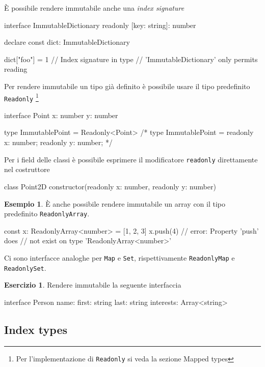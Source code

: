 \documentclass[12pt]{article}
\theoremstyle{definition}
\newtheorem{example}{Esempio}[subsection]
\newtheorem{exercise}{Esercizio}[subsection]
\newenvironment{code}
  {\vspace{0.5cm} \VerbatimEnvironment\begin{typescriptcode}}
  {\end{typescriptcode} \vspace{0.2cm}}
\begin{document}
È possibile rendere immutabile anche una \emph{index signature}

\begin{code}
interface ImmutableDictionary {
  readonly [key: string]: number
}

declare const dict: ImmutableDictionary

dict["foo"] = 1 // Index signature in type
// 'ImmutableDictionary' only permits reading
\end{code}

Per rendere immutabile un tipo già definito è possibile usare il tipo predefinito \texttt{Readonly}
\footnote{Per l'implementazione di \texttt{Readonly} si veda la sezione Mapped types}

\begin{code}
interface Point {
  x: number
  y: number
}

type ImmutablePoint = Readonly<Point>
/*
type ImmutablePoint = {
    readonly x: number;
    readonly y: number;
}
*/
\end{code}

Per i field delle classi è possibile esprimere il modificatore \texttt{readonly} direttamente nel costruttore

\begin{code}
class Point2D {
  constructor(readonly x: number, readonly y: number) {}
}
\end{code}

\begin{example}
È anche possibile rendere immutabile un array con il tipo predefinito
\texttt{ReadonlyArray}.

\begin{code}
const x: ReadonlyArray<number> = [1, 2, 3]
x.push(4) // error: Property 'push' does
// not exist on type 'ReadonlyArray<number>'
\end{code}
\end{example}

Ci sono interfacce analoghe per \texttt{Map} e \texttt{Set}, rispettivamente \texttt{ReadonlyMap} e \texttt{ReadonlySet}.

\begin{exercise}
Rendere immutabile la seguente interfaccia

\begin{code}
interface Person {
  name: {
    first: string
    last: string
  }
  interests: Array<string>
}
\end{code}
\end{exercise}

\subsection{Index types}
\end{document}
